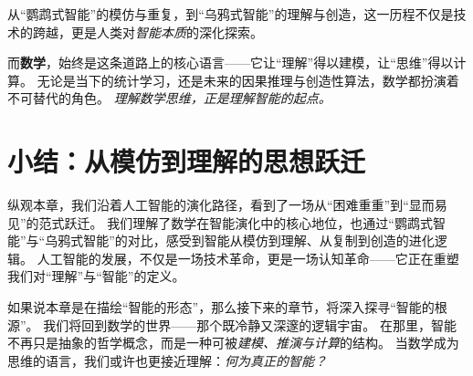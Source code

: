 从“鹦鹉式智能”的模仿与重复，到“乌鸦式智能”的理解与创造，这一历程不仅是技术的跨越，更是人类对\emph{智能本质}的深化探索。  

而\textbf{数学}，始终是这条道路上的核心语言——它让“理解”得以建模，让“思维”得以计算。  
无论是当下的统计学习，还是未来的因果推理与创造性算法，数学都扮演着不可替代的角色。  
\emph{理解数学思维，正是理解智能的起点。}  

\section{小结：从模仿到理解的思想跃迁}

纵观本章，我们沿着人工智能的演化路径，看到了一场从“困难重重”到“显而易见”的范式跃迁。  
我们理解了数学在智能演化中的核心地位，也通过“鹦鹉式智能”与“乌鸦式智能”的对比，感受到智能从模仿到理解、从复制到创造的进化逻辑。  
人工智能的发展，不仅是一场技术革命，更是一场认知革命——它正在重塑我们对“理解”与“智能”的定义。  

如果说本章是在描绘“智能的形态”，那么接下来的章节，将深入探寻“智能的根源”。  
我们将回到数学的世界——那个既冷静又深邃的逻辑宇宙。  
在那里，智能不再只是抽象的哲学概念，而是一种可被\emph{建模、推演与计算}的结构。  
当数学成为思维的语言，我们或许也更接近理解：\emph{何为真正的智能？}  

\nocite{*}
